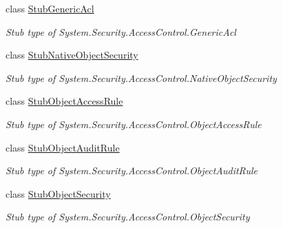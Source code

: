 \begin{DoxyCompactItemize}
class \hyperlink{class_system_1_1_security_1_1_access_control_1_1_fakes_1_1_stub_generic_acl}{Stub\-Generic\-Acl}
\begin{DoxyCompactList}\small\item\em Stub type of System.\-Security.\-Access\-Control.\-Generic\-Acl\end{DoxyCompactList}\item 
class \hyperlink{class_system_1_1_security_1_1_access_control_1_1_fakes_1_1_stub_native_object_security}{Stub\-Native\-Object\-Security}
\begin{DoxyCompactList}\small\item\em Stub type of System.\-Security.\-Access\-Control.\-Native\-Object\-Security\end{DoxyCompactList}\item 
class \hyperlink{class_system_1_1_security_1_1_access_control_1_1_fakes_1_1_stub_object_access_rule}{Stub\-Object\-Access\-Rule}
\begin{DoxyCompactList}\small\item\em Stub type of System.\-Security.\-Access\-Control.\-Object\-Access\-Rule\end{DoxyCompactList}\item 
class \hyperlink{class_system_1_1_security_1_1_access_control_1_1_fakes_1_1_stub_object_audit_rule}{Stub\-Object\-Audit\-Rule}
\begin{DoxyCompactList}\small\item\em Stub type of System.\-Security.\-Access\-Control.\-Object\-Audit\-Rule\end{DoxyCompactList}\item 
class \hyperlink{class_system_1_1_security_1_1_access_control_1_1_fakes_1_1_stub_object_security}{Stub\-Object\-Security}
\begin{DoxyCompactList}\small\item\em Stub type of System.\-Security.\-Access\-Control.\-Object\-Security\end{DoxyCompactList}\end{DoxyCompactItemize}
